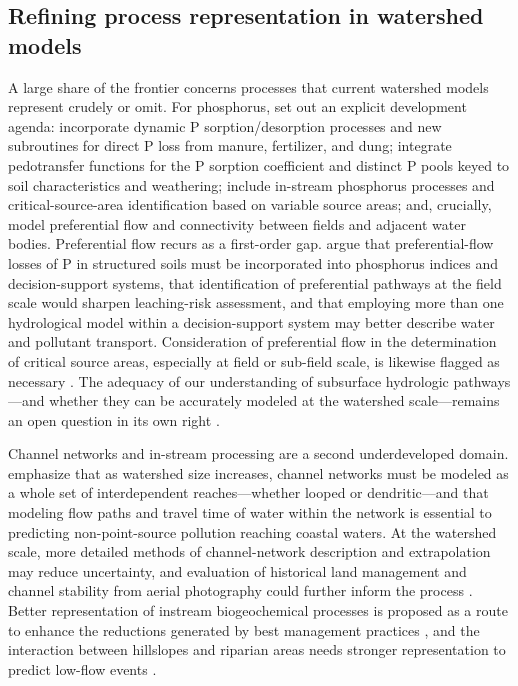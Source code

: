 \documentclass[11pt]{article}
\begin{document}
\subsection{Refining process representation in watershed models}

A large share of the frontier concerns processes that current watershed models represent crudely or omit. For phosphorus, \textcite{Wang2020b} set out an explicit development agenda: incorporate dynamic P sorption/desorption processes and new subroutines for direct P loss from manure, fertilizer, and dung; integrate pedotransfer functions for the P sorption coefficient and distinct P pools keyed to soil characteristics and weathering; include in-stream phosphorus processes and critical-source-area identification based on variable source areas; and, crucially, model preferential flow and connectivity between fields and adjacent water bodies. Preferential flow recurs as a first-order gap. \textcite{Djodjic2002} argue that preferential-flow losses of P in structured soils must be incorporated into phosphorus indices and decision-support systems, that identification of preferential pathways at the field scale would sharpen leaching-risk assessment, and that employing more than one hydrological model within a decision-support system may better describe water and pollutant transport. Consideration of preferential flow in the determination of critical source areas, especially at field or sub-field scale, is likewise flagged as necessary \parencite{Wang2020b}. The adequacy of our understanding of subsurface hydrologic pathways---and whether they can be accurately modeled at the watershed scale---remains an open question in its own right \parencite{Sims1998}.

Channel networks and in-stream processing are a second underdeveloped domain. \textcite{Giraud1997} emphasize that as watershed size increases, channel networks must be modeled as a whole set of interdependent reaches---whether looped or dendritic---and that modeling flow paths and travel time of water within the network is essential to predicting non-point-source pollution reaching coastal waters. At the watershed scale, more detailed methods of channel-network description and extrapolation may reduce uncertainty, and evaluation of historical land management and channel stability from aerial photography could further inform the process \parencite{Williamson2025}. Better representation of instream biogeochemical processes is proposed as a route to enhance the reductions generated by best management practices \parencite{Schilling2012b}, and the interaction between hillslopes and riparian areas needs stronger representation to predict low-flow events \parencite{Basu2010}.
\end{document}

